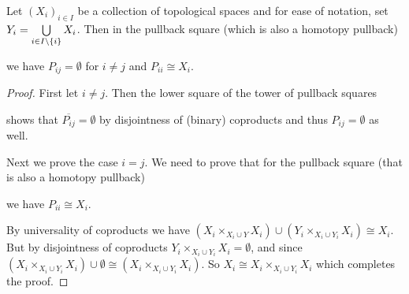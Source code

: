 \begin{corollary}\label{cor:genCoproductComponentPb}
    Let $\left(X_i\right)_{i\in I}$ be a collection of topological spaces and for ease of notation, set $Y_i=\bigcup\limits_{i\in I\setminus{\left\lbrace i\right\rbrace}}X_i$.
    Then in the pullback square (which is also a homotopy pullback)
    \begin{center}
    \end{center}
    we have $P_{ij}=\emptyset$ for $i\neq j$ and $P_{ii}\cong X_i$.
    \begin{proof}
        First let $i\neq j$.
        Then the lower square of the tower of pullback squares 
        \begin{center}
        \end{center}
        shows that $\overline{P_{ij}}=\emptyset$ by disjointness of (binary) coproducts and thus $P_{ij}=\emptyset$ as well.

        Next we prove the case $i=j$. 
        We need to prove that for the pullback square (that is also a homotopy pullback)
        \begin{center}
        \end{center}
        we have $P_{ii}\cong X_i$. 

        By universality of coproducts we have $\left(X_i\times_{X_i\cup Y}X_i\right)\cup\left(Y_i\times_{X_i\cup Y_i}X_i\right)\cong X_i$.
        But by disjointness of coproducts $Y_i\times_{X_i\cup Y_i}X_i=\emptyset$, and since $\left(X_i\times_{X_i\cup Y_i}X_i\right)\cup\emptyset\cong\left(X_i\times_{X_i\cup Y_i}X_i\right)$.
        So $X_i\cong X_i\times_{X_i\cup Y_i}X_i$ which completes the proof.
    \end{proof}
\end{corollary}
